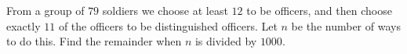 From a group of $79$ soldiers we choose at least $12$ to be officers, and then choose exactly $11$ of the officers to be distinguished officers. Let $n$ be the number of ways to do this. Find the remainder when $n$ is divided by $1000$.
